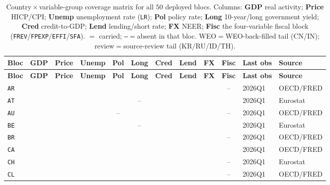 \documentclass[11pt]{article}
\newcommand{\cmark}{{\color{green!55!black}\checkmark}}
\theoremstyle{definition}
\theoremstyle{remark}
\begin{document}
\begin{landscape}
\thispagestyle{empty}
{\footnotesize
\begin{longtable}{@{}l ccccccccc l l@{}}
\caption{Country\,$\times$\,variable-group coverage matrix for all $50$
deployed blocs. Columns: \textbf{GDP} real activity; \textbf{Price}
HICP/CPI; \textbf{Unemp} unemployment rate (\texttt{LR}); \textbf{Pol}
policy rate; \textbf{Long} 10-year/long government yield; \textbf{Cred}
credit-to-GDP; \textbf{Lend} lending/short rate; \textbf{FX} NEER;
\textbf{Fisc} the four-variable fiscal block
(\texttt{FREV}/\texttt{FPEXP}/\texttt{EFFI}/\texttt{SFA}). \cmark${}={}$%
carried; \texttt{--}${}={}$absent in that bloc. WEO${}={}$WEO-back-filled
tail (CN/IN); review${}={}$source-review tail (KR/RU/ID/TH).}
\label{tab:coverage}\\
\toprule
\textbf{Bloc} & \textbf{GDP} & \textbf{Price} & \textbf{Unemp} &
\textbf{Pol} & \textbf{Long} & \textbf{Cred} & \textbf{Lend} &
\textbf{FX} & \textbf{Fisc} & \textbf{Last obs} & \textbf{Source} \\
\midrule
\endfirsthead
\toprule
\textbf{Bloc} & \textbf{GDP} & \textbf{Price} & \textbf{Unemp} &
\textbf{Pol} & \textbf{Long} & \textbf{Cred} & \textbf{Lend} &
\textbf{FX} & \textbf{Fisc} & \textbf{Last obs} & \textbf{Source} \\
\midrule
\endhead
\bottomrule
\endfoot
\texttt{AR} & \cmark & \cmark & \cmark & \cmark & \cmark & \cmark & \cmark & \cmark & -- & 2026Q1 & OECD/FRED \\
\texttt{AT} & \cmark & \cmark & \cmark & \cmark & -- & \cmark & \cmark & \cmark & \cmark & 2026Q1 & Eurostat \\
\texttt{AU} & \cmark & \cmark & \cmark & -- & \cmark & \cmark & \cmark & \cmark & -- & 2026Q1 & OECD/FRED \\
\texttt{BE} & \cmark & \cmark & \cmark & \cmark & -- & \cmark & \cmark & \cmark & \cmark & 2026Q1 & Eurostat \\
\texttt{BR} & \cmark & \cmark & \cmark & \cmark & \cmark & \cmark & \cmark & \cmark & -- & 2026Q1 & OECD/FRED \\
\texttt{CA} & \cmark & \cmark & \cmark & \cmark & \cmark & \cmark & \cmark & \cmark & \cmark & 2026Q1 & OECD/FRED \\
\texttt{CH} & \cmark & \cmark & \cmark & \cmark & \cmark & \cmark & \cmark & \cmark & -- & 2026Q1 & Eurostat \\
\texttt{CL} & \cmark & \cmark & \cmark & \cmark & \cmark & \cmark & \cmark & \cmark & -- & 2026Q1 & OECD/FRED \\

\end{longtable}}
\end{landscape}
\end{document}
